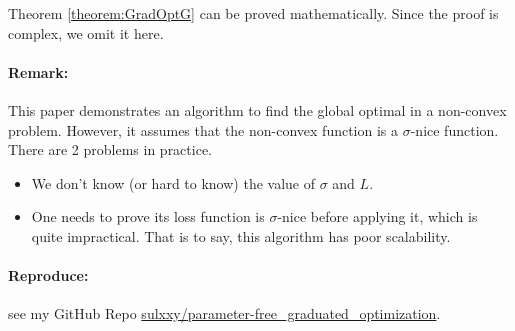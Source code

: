 Theorem \ref{theorem:GradOptG} can be proved mathematically. Since the proof is complex, we omit it here.

\paragraph{Remark: } This paper demonstrates an algorithm to find the global optimal in a non-convex problem. However, it assumes that the non-convex function is a $\sigma$-nice function. There are 2 problems in practice. 
\begin{itemize}
    \item We don't know (or hard to know) the value of $\sigma$ and $L$.
    \item One needs to prove its loss function is $\sigma$-nice before applying it, which is quite impractical. That is to say, this algorithm has poor scalability. 
\end{itemize}

\paragraph{Reproduce: } see my GitHub Repo \href{https://github.com/sulxxy/parameter-free_graduated_optimization/tree/master/reproductions/graduated_opt_for_non-convex}{sulxxy/parameter-free\_graduated\_optimization}.